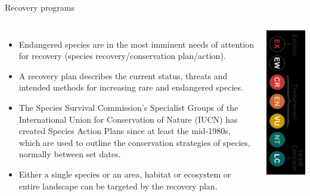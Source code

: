 \documentclass[
  ignorenonframetext,
  aspectratio=169]{beamer}
\providecommand{\tightlist}{%
  \setlength{\itemsep}{0pt}\setlength{\parskip}{0pt}}
\newcommand{\bcolumns}{\begin{columns}[T, onlytextwidth]}
\newcommand{\ecolumns}{\end{columns}}
\begin{document}
\begin{frame}{Recovery programs}
\protect\hypertarget{recovery-programs}{}
\bcolumns
{}

\begin{itemize}
\tightlist
\item
  Endangered species are in the most imminent needs of attention for
  recovery (species recovery/conservation plan/action).
\item
  A recovery plan describes the current status, threats and intended
  methods for increasing rare and endangered species.
\item
  The Species Survival Commission's Specialist Groups of the
  International Union for Conservation of Nature (IUCN) has created
  Species Action Plans since at least the mid-1980s, which are used to
  outline the conservation strategies of species, normally between set
  dates.
\item
  Either a single species or an area, habitat or ecosystem or entire
  landscape can be targeted by the recovery plan.
\end{itemize}


\begin{center}\includegraphics[width=0.4\linewidth]{../images/IUCN_classification} \end{center}

\ecolumns
\end{frame}
\end{document}
